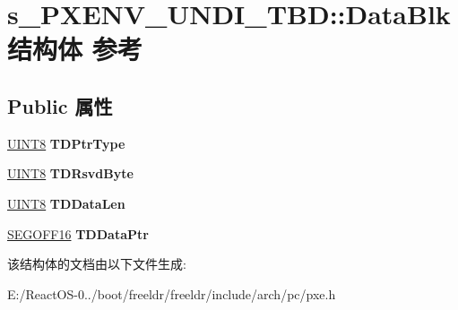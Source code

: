 \hypertarget{structs___p_x_e_n_v___u_n_d_i___t_b_d_1_1_data_blk}{}\section{s\+\_\+\+P\+X\+E\+N\+V\+\_\+\+U\+N\+D\+I\+\_\+\+T\+BD\+:\+:Data\+Blk结构体 参考}
\label{structs___p_x_e_n_v___u_n_d_i___t_b_d_1_1_data_blk}
\subsection*{Public 属性}
\begin{DoxyCompactItemize}
\item 
\mbox{\label{structs___p_x_e_n_v___u_n_d_i___t_b_d_1_1_data_blk_a969e817d39cac08d7ae4cb685e968b58}} 
\hyperlink{_processor_bind_8h_ab27e9918b538ce9d8ca692479b375b6a}{U\+I\+N\+T8} {\bfseries T\+D\+Ptr\+Type}
\item 
\mbox{\label{structs___p_x_e_n_v___u_n_d_i___t_b_d_1_1_data_blk_a81c1107432a1ab65703c01a7fa2beb96}} 
\hyperlink{_processor_bind_8h_ab27e9918b538ce9d8ca692479b375b6a}{U\+I\+N\+T8} {\bfseries T\+D\+Rsvd\+Byte}
\item 
\mbox{\label{structs___p_x_e_n_v___u_n_d_i___t_b_d_1_1_data_blk_ac66099219378395f7303c4193e65f9a5}} 
\hyperlink{_processor_bind_8h_ab27e9918b538ce9d8ca692479b375b6a}{U\+I\+N\+T8} {\bfseries T\+D\+Data\+Len}
\item 
\mbox{\label{structs___p_x_e_n_v___u_n_d_i___t_b_d_1_1_data_blk_a421b985f371907c4110813dc45ab1089}} 
\hyperlink{structs___s_e_g_o_f_f16}{S\+E\+G\+O\+F\+F16} {\bfseries T\+D\+Data\+Ptr}
\end{DoxyCompactItemize}


该结构体的文档由以下文件生成\+:\begin{DoxyCompactItemize}
\item 
E\+:/\+React\+O\+S-\/0../boot/freeldr/freeldr/include/arch/pc/pxe.\+h\end{DoxyCompactItemize}
